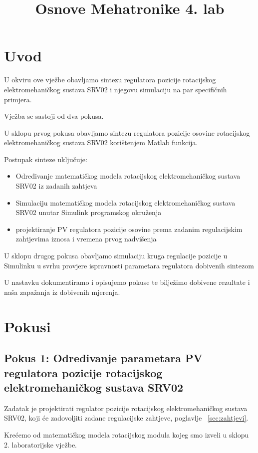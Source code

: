 \documentclass[12pt,a4paper]{article}
\title{Osnove Mehatronike 4. lab}
\begin{document}
\section{Uvod}
U okviru ove vježbe obavljamo sintezu regulatora pozicije rotacijskog elektromehaničkog sustava SRV02 i njegovu simulaciju na par specifičnih primjera.
\newline

Vježba se sastoji od dva pokusa.


U sklopu prvog pokusa obavljamo sintezu regulatora pozicije osovine rotacijskog elektromehaničkog sustava SRV02 korištenjem Matlab funkcija.

Postupak sinteze uključuje:

\begin{itemize}
  \item Određivanje matematičkog modela rotacijskog elektromehaničkog sustava SRV02 iz zadanih zahtjeva
  \item Simulaciju matematičkog modela rotacijskog elektromehaničkog sustava SRV02 unutar Simulink programskog okruženja 
  \item projektiranje PV regulatora pozicije osovine prema zadanim regulacijskim
zahtjevima iznosa i vremena prvog nadvišenja 
\end{itemize}

U sklopu drugog pokusa obavljamo simulaciju kruga regulacije pozicije u Simulinku u svrhu provjere ispravnosti parametara regulatora dobivenih sintezom
\newline 

U nastavku dokumentiramo i opisujemo pokuse te bilježimo dobivene rezultate i naša zapažanja iz dobivenih mjerenja.

\newpage

\section{Pokusi}
\subsection{Pokus 1: Određivanje parametara PV regulatora pozicije rotacijskog elektromehaničkog sustava SRV02}

Zadatak je projektirati regulator pozicije rotacijskog elektromehaničkog sustava  SRV02, koji će zadovoljiti zadane regulacijske zahtjeve, poglavlje ~\ref{sec:zahtjevi}. 

Krećemo od matematičkog modela rotacijskog modula kojeg smo izveli u sklopu 2. laboratorijske vježbe.
\end{document}
